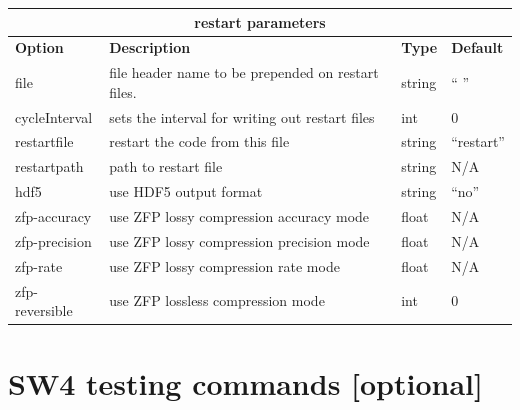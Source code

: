 \documentclass[11pt]{report}
\begin{document}
\begin{center}
\begin{tabular}{|l|p{8cm}|l|l|} \hline
\multicolumn{4}{|c|}{\bf restart parameters}\\ \hline
\bf{Option} & \bf{Description} & \bf{Type} & \bf{Default} \\ \hline \hline
file & file header name to be prepended on restart files. & string & `` ''  \\ 
\hline
cycleInterval & sets the interval for writing out restart files & int & 0 \\ 
\hline
restartfile & restart the code from this file & string & ``restart''  \\ \hline
restartpath & path to restart file & string & N/A \\ \hline
hdf5 & use HDF5 output format & string & ``no'' \\ \hline
zfp-accuracy & use ZFP lossy compression accuracy mode & float & N/A \\ \hline
zfp-precision & use ZFP lossy compression precision mode & float & N/A \\ \hline
zfp-rate & use ZFP lossy compression rate mode & float & N/A \\ \hline
zfp-reversible & use ZFP lossless compression mode & int & 0 \\ \hline

\end{tabular}
\end{center}



\section{SW4 testing commands [optional]}

\end{document}

